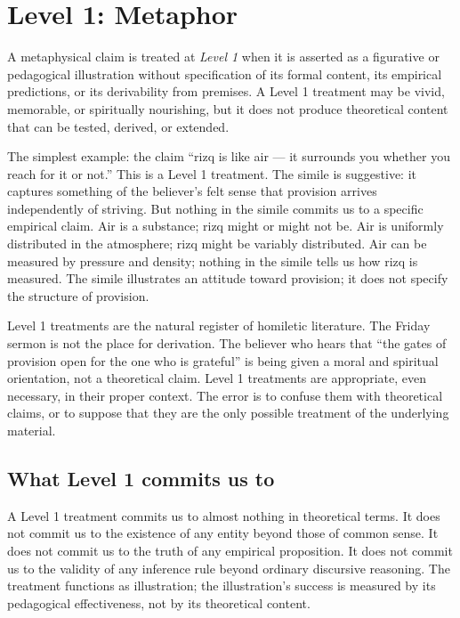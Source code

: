 \section{Level 1: Metaphor}
\label{sec:level-1}

\begin{definition}
\label{def:metaphor}
A metaphysical claim is treated at \emph{Level 1} when it is asserted
as a figurative or pedagogical illustration without specification of
its formal content, its empirical predictions, or its derivability
from premises. A Level 1 treatment may be vivid, memorable, or
spiritually nourishing, but it does not produce theoretical content
that can be tested, derived, or extended.
\end{definition}

The simplest example: the claim ``rizq is like air --- it surrounds
you whether you reach for it or not.'' This is a Level 1 treatment.
The simile is suggestive: it captures something of the believer's
felt sense that provision arrives independently of striving. But
nothing in the simile commits us to a specific empirical claim.
Air is a substance; rizq might or might not be. Air is uniformly
distributed in the atmosphere; rizq might be variably distributed.
Air can be measured by pressure and density; nothing in the simile
tells us how rizq is measured. The simile illustrates an attitude
toward provision; it does not specify the structure of provision.

Level 1 treatments are the natural register of homiletic literature.
The Friday sermon is not the place for derivation. The believer who
hears that ``the gates of provision open for the one who is
grateful'' is being given a moral and spiritual orientation, not a
theoretical claim. Level 1 treatments are appropriate, even necessary,
in their proper context. The error is to confuse them with
theoretical claims, or to suppose that they are the only possible
treatment of the underlying material.

\subsection{What Level 1 commits us to}

A Level 1 treatment commits us to almost nothing in theoretical
terms. It does not commit us to the existence of any entity beyond
those of common sense. It does not commit us to the truth of any
empirical proposition. It does not commit us to the validity of
any inference rule beyond ordinary discursive reasoning. The
treatment functions as illustration; the illustration's success is
measured by its pedagogical effectiveness, not by its theoretical
content.

